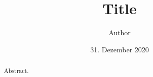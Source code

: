 \documentclass[english,algorithms,reviews,examples]{isasthesis}
\title{Title}
\author{Author}
\date{31. Dezember 2020}
\begin{document}
    \maketitle

    \begin{abstract}
        Abstract.
    \end{abstract}

    \maketoc


    
    
\end{document}
